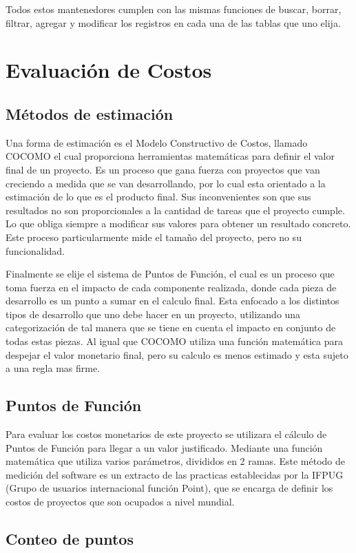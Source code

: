 \documentclass[a4paper,12pt,openany,oneside]{book}
\begin{document}
Todos estos mantenedores cumplen con las mismas funciones de buscar, borrar, filtrar, agregar y modificar los registros en cada una de las tablas que uno elija.
\chapter{Evaluación de Costos}
\section{Métodos de estimación}
Una forma de estimación es el Modelo Constructivo de Costos, llamado COCOMO el cual proporciona herramientas matemáticas para definir el valor final de un proyecto. Es un proceso que gana fuerza con proyectos que van creciendo a medida que se van desarrollando, por lo cual esta orientado a la estimación de lo que es el producto final. Sus inconvenientes son que sus resultados no son proporcionales a la cantidad de tareas que el proyecto cumple. Lo que obliga siempre a modificar sus valores para obtener un resultado concreto. Este proceso particularmente mide el tamaño 
del proyecto, pero no su funcionalidad.

Finalmente se elije el sistema de Puntos de Función, el cual es un proceso que toma fuerza en el impacto de cada componente realizada, donde cada pieza de desarrollo es un punto a sumar en el calculo final. Esta enfocado a los distintos tipos de desarrollo que uno debe hacer en un proyecto, utilizando una categorización de tal manera que se tiene en cuenta el impacto en conjunto de todas estas piezas. Al igual que COCOMO utiliza una función matemática para despejar el valor monetario final, pero su calculo es menos estimado y esta sujeto a una regla mas firme.
\section{Puntos de Función}
Para evaluar los costos monetarios de este proyecto se utilizara el cálculo de Puntos de Función para llegar a un valor justificado. Mediante una función matemática que utiliza varios parámetros, divididos en 2 ramas. Este método de medición del software es un extracto de las practicas establecidas por la IFPUG (Grupo de usuarios internacional función Point), que se encarga de definir los costos de proyectos que son ocupados a nivel mundial.

\section{Conteo de puntos}
\end{document}
